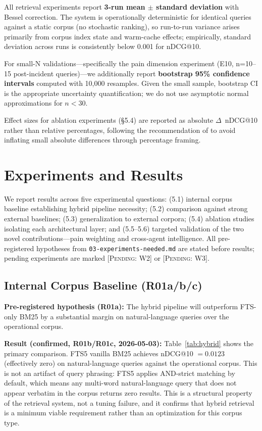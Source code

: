 \documentclass{article}
\begin{document}
All retrieval experiments report \textbf{3-run mean $\pm$ standard deviation} with Bessel
correction. The system is operationally deterministic for identical queries against a
static corpus (no stochastic ranking), so run-to-run variance arises primarily from corpus
index state and warm-cache effects; empirically, standard deviation across runs is
consistently below 0.001 for nDCG@10.

For small-N validations---specifically the pain dimension experiment (E10,
n=10--15 post-incident queries)---we additionally report \textbf{bootstrap 95\% confidence
intervals} computed with 10,000 resamples. Given the small sample, bootstrap CI is the
appropriate uncertainty quantification; we do not use asymptotic normal approximations for
$n < 30$.

Effect sizes for ablation experiments (\S5.4) are reported as absolute $\Delta$~nDCG@10
rather than relative percentages, following the recommendation of \cite{fuhr2018some} to
avoid inflating small absolute differences through percentage framing.

\section{Experiments and Results}

We report results across five experimental questions: (5.1) internal corpus baseline
establishing hybrid pipeline necessity; (5.2) comparison against strong external baselines;
(5.3) generalization to external corpora; (5.4) ablation studies isolating each
architectural layer; and (5.5--5.6) targeted validation of the two novel contributions---pain
weighting and cross-agent intelligence. All pre-registered hypotheses from
\texttt{03-experiments-needed.md} are stated before results; pending experiments are marked
\textsc{[Pending: W2]} or \textsc{[Pending: W3]}.

\subsection{Internal Corpus Baseline (R01a/b/c)}

\textbf{Pre-registered hypothesis (R01a):} The hybrid pipeline will outperform FTS-only
BM25 by a substantial margin on natural-language queries over the operational corpus.

\textbf{Result (confirmed, R01b/R01c, 2026-05-03):} Table~\ref{tab:hybrid} shows the
primary comparison. FTS5 vanilla BM25 achieves nDCG@10 $= 0.0123$ (effectively zero) on
natural-language queries against the operational corpus. This is not an artifact of query
phrasing: FTS5 applies AND-strict matching by default, which means any multi-word
natural-language query that does not appear verbatim in the corpus returns zero results.
This is a structural property of the retrieval system, not a tuning failure, and it
confirms that hybrid retrieval is a minimum viable requirement rather than an optimization
for this corpus type.
\end{document}
